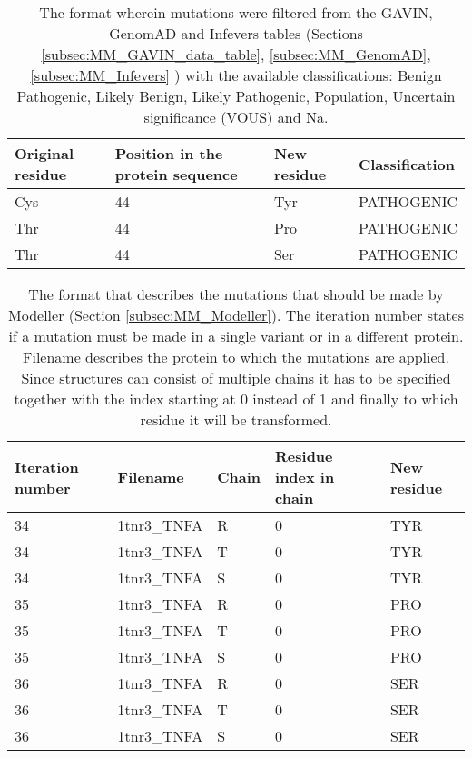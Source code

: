

\begin{table}[ht]
	\begin{tabular}{ l | l | l | l}
		Original residue & Position in the protein sequence & New residue & Classification\\ \hline
		Cys & 44 & Tyr & PATHOGENIC\\
		Thr & 44 & Pro & PATHOGENIC\\
		Thr & 44 & Ser & PATHOGENIC\\
	\end{tabular}
	\caption{The format wherein mutations were filtered from the GAVIN, GenomAD and Infevers tables (Sections \ref{subsec:MM_GAVIN_data_table},  \ref{subsec:MM_GenomAD}, \ref{subsec:MM_Infevers} ) with the available classifications: Benign Pathogenic, Likely Benign, Likely Pathogenic, Population, Uncertain significance (VOUS) and Na.}
	\label{table:Res_Filtered_Mutations}
\end{table}

\begin{table}[ht]
	\begin{tabular}{ l | l | l | l | l}
		Iteration number & Filename & Chain & Residue index in chain & New residue\\ \hline
		34 & 1tnr3\_TNFA & R & 0 & TYR\\
		34 & 1tnr3\_TNFA & T & 0 & TYR\\
		34 & 1tnr3\_TNFA & S & 0 & TYR\\
		35 & 1tnr3\_TNFA & R & 0 & PRO\\
		35 & 1tnr3\_TNFA & T & 0 & PRO\\
		35 & 1tnr3\_TNFA & S & 0 & PRO\\
		36 & 1tnr3\_TNFA & R & 0 & SER\\
		36 & 1tnr3\_TNFA & T & 0 & SER\\
		36 & 1tnr3\_TNFA & S & 0 & SER\\
	\end{tabular}
	\caption{The format that describes the mutations that should be made by Modeller (Section \ref{subsec:MM_Modeller}). The iteration number states if a mutation must be made in a single variant or in a different protein. Filename describes the protein to which the mutations are applied. Since structures can consist of multiple chains it has to be specified together with the index starting at 0 instead of 1 and finally to which residue it will be transformed.}
		\label{table:Res_Modeller_Mutation_Format}
\end{table}

